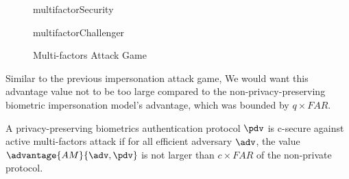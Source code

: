 \begin{description}
\begin{description}
    \begin{figure}[!h]
      \begin{center}
        \begin{bbrenv}{multifactorSecurity}
          \begin{bbrbox}[name=Adversary, minheight=3cm]
          \end{bbrbox}
          \begin{bbrchallenger}{multifactorChallenger}
            \begin{bbrbox}[name=Challenger, minheight=2cm]
            \end{bbrbox}
          \end{bbrchallenger}
        \end{bbrenv}
      \end{center}
      \caption{Multi-factors Attack Game}
      \label{fig:multifactorAttackGame}
    \end{figure}
    
    Similar to the previous impersonation attack game, We would want this
    advantage value not to be too large compared to the non-privacy-preserving
    biometric impersonation model's advantage, which was bounded by
    $q \times FAR$.
  \end{description}

\end{description}
\begin{definition}
   A privacy-preserving biometrics authentication
  protocol $\pdv$ is c-secure against active multi-factors attack if for all
  efficient adversary $\adv$, the value $\advantage{AM}{\adv,\pdv}$ is not
  larger than $c \times FAR$ of the non-private protocol.
\end{definition}

